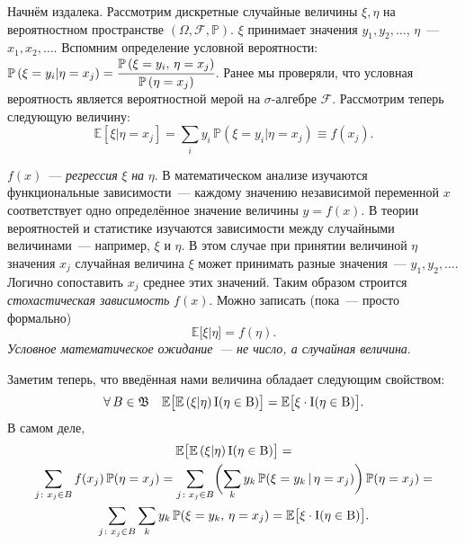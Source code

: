     Начнём издалека. 
    Рассмотрим дискретные случайные величины $\xi, \eta$ на вероятностном пространстве $(\Omega, \mathcal{F}, \mathbb{P})$. 
    $\xi$ принимает значения $y_1, y_2, \ldots$, $\eta$~--- $x_1, x_2, \ldots$.
    Вспомним определение условной вероятности: ${\mathbb{P}\left( \xi = y_i | \eta = x_j \right) = \cfrac{\mathbb{P}\left( \xi = y_i, \, \eta = x_j\right)}{\mathbb{P}\left(\eta = x_j\right)}}$.
    Ранее мы проверяли, что условная вероятность является вероятностной мерой на $\sigma$-алгебре $\mathcal{F}$.
    Рассмотрим теперь следующую величину:
    \begin{equation}
        \boxed{\mathbb{E}\left[ \xi | \eta = x_j \right] = 
        \sum\limits_i y_i \, \mathbb{P}\left(\xi = y_i | \eta = x_j \right) \equiv
        f(x_j).}
        \label{cond_exp:discrete}
    \end{equation}
    
    $f(x)$~--- \textit{регрессия} $\xi$ \textit{на} $\eta$. 
    В математическом анализе изучаются функциональные зависимости~--- каждому значению независимой переменной $x$ соответствует одно определённое значение величины $y = f(x)$.
    В теории вероятностей и статистике изучаются зависимости между случайными величинами~--- например, $\xi$ и $\eta$.
    В этом случае при принятии величиной $\eta$ значения $x_j$ случайная величина $\xi$ может принимать разные значения~--- $y_1, y_2, \ldots$.
    Логично сопоставить $x_j$ среднее этих значений.
    Таким образом строится \textit{стохастическая зависимость} $f(x)$.
    Можно записать (пока~--- просто формально)
    $$ \mathbb{E} \bigl[\xi | \eta \bigr] = f(\eta).$$
    \textit{Условное математическое ожидание~--- не число, а случайная величина}.
    
    Заметим теперь, что введённая нами величина обладает следующим свойством:
    \begin{equation*}
        \forall \, B \in \mathfrak{B} \quad \mathbb{E}\bigl[ \mathbb{E}\left( \xi | \eta\right) \rm{I}(\eta \in B)\bigr] = 
        \mathbb{E} \bigl[ \xi \cdot \rm{I}(\eta \in B) \bigr].
    \end{equation*}
    В самом деле,
    \begin{gather*}
        \mathbb{E}\bigl[ \mathbb{E}\left( \xi | \eta\right) \rm{I}(\eta \in B)\bigr] = \\
        \sum\limits_{j \colon x_j \in B} f(x_j) \, \mathbb{P}(\eta = x_j) = 
        \sum\limits_{j \colon x_j \in B} \biggl( \sum\limits_k y_k \, \mathbb{P}(\xi = y_k \,|\, \eta = x_j) \biggr) \, \mathbb{P}(\eta = x_j) = \\
        \sum\limits_{j \colon x_j \in B} \sum\limits_k y_k \, \mathbb{P}(\xi = y_k, \, \eta = x_j) = 
        \mathbb{E} \bigl[ \xi \cdot \rm{I}(\eta \in B)\bigr].
    \end{gather*}

